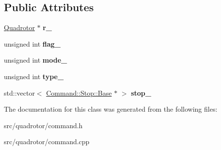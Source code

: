 \subsection*{Public Attributes}
\begin{DoxyCompactItemize}
\item 
\hypertarget{classCommand_1_1Base_ad10b11ae9f939a0d88eec17591389106}{
\hyperlink{classQuadrotor}{Quadrotor} $\ast$ {\bfseries r\_\-}}
\label{classCommand_1_1Base_ad10b11ae9f939a0d88eec17591389106}

\item 
\hypertarget{classCommand_1_1Base_af73a59e7026b8f879d7bc4a8091b729c}{
unsigned int {\bfseries flag\_\-}}
\label{classCommand_1_1Base_af73a59e7026b8f879d7bc4a8091b729c}

\item 
\hypertarget{classCommand_1_1Base_a9f27c385185e92121075275d2d9b8eba}{
unsigned int {\bfseries mode\_\-}}
\label{classCommand_1_1Base_a9f27c385185e92121075275d2d9b8eba}

\item 
\hypertarget{classCommand_1_1Base_acb491ef2bb4053594e77e877aaecfade}{
unsigned int {\bfseries type\_\-}}
\label{classCommand_1_1Base_acb491ef2bb4053594e77e877aaecfade}

\item 
\hypertarget{classCommand_1_1Base_ae8f49ff59722fb70fcf4d735129ef23a}{
std::vector$<$ \hyperlink{classCommand_1_1Stop_1_1Base}{Command::Stop::Base} $\ast$ $>$ {\bfseries stop\_\-}}
\label{classCommand_1_1Base_ae8f49ff59722fb70fcf4d735129ef23a}

\end{DoxyCompactItemize}


The documentation for this class was generated from the following files:\begin{DoxyCompactItemize}
\item 
src/quadrotor/command.h\item 
src/quadrotor/command.cpp\end{DoxyCompactItemize}
